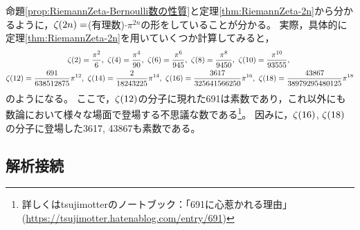 \documentclass[a4paper,draft]{ltjsarticle}
\begin{document}
\begin{eg}
    命題\ref{prop:RiemannZeta-Bernoulli数の性質}と定理\ref{thm:RiemannZeta-2n}から分かるように，$\fun{\zeta}{2n}=$(有理数)$\cdot \pi^{2n}$の形をしていることが分かる。
    実際，具体的に定理\ref{thm:RiemannZeta-2n}を用いていくつか計算してみると，
    \begin{gather}
        \fun{\zeta}{2}=\frac{\pi^2}{6},\
        \fun{\zeta}{4}=\frac{\pi^4}{90},\
        \fun{\zeta}{6}=\frac{\pi^6}{945},\
        \fun{\zeta}{8}=\frac{\pi^8}{9450},\
        \fun{\zeta}{10}=\frac{\pi^{10}}{93555},\
        \\
        \fun{\zeta}{12}=\frac{691}{638512875}\pi^{12},\
        \fun{\zeta}{14}=\frac{2}{18243225}\pi^{14},\
        \fun{\zeta}{16}=\frac{3617}{325641566250}\pi^{16},\
        \fun{\zeta}{18}=\frac{43867}{38979295480125}\pi^{18}
    \end{gather}
    のようになる。
    ここで，$\fun{\zeta}{12}$の分子に現れた691は素数であり，これ以外にも数論において様々な場面で登場する不思議な数である\footnote{詳しくはtsujimotterのノートブック：「691に心惹かれる理由」(\url{https://tsujimotter.hatenablog.com/entry/691})}。
    因みに，$\fun{\zeta}{16}$, $\fun{\zeta}{18}$の分子に登場した3617, 43867も素数である。
\end{eg}

\subsection{解析接続}
\end{document}
